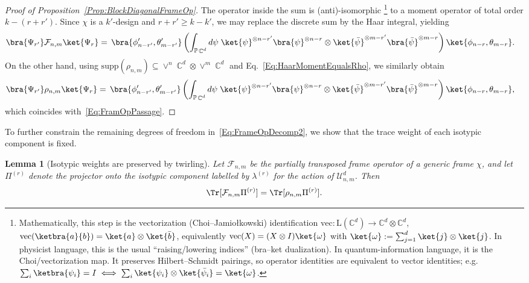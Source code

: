 \documentclass[aps,twocolumn,pra,superscriptaddress,nofootinbib]{revtex4-2}
\newtheorem{lem}{Lemma}
\DeclareMathOperator{\C}{\mathbb{C}} %
\begin{document}
\begin{proof}[Proof of Proposition~\ref{Prop:BlockDiagonalFrameOp}]
The operator inside the sum is (anti)-isomorphic \footnote{Mathematically, this step is the vectorization (Choi--Jamiołkowski) identification
$\mathrm{vec}:\mathrm{L}(\mathbb C^d)\to \mathbb C^d\otimes\mathbb C^d$,
$\mathrm{vec}(\ketbra{a}{b})=\ket{a}\otimes\ket{\bar b}$, equivalently
$\mathrm{vec}(X)=(X\otimes I)\ket{\omega}$ with
$\ket{\omega}:=\sum_{j=1}^d\ket{j}\otimes\ket{j}$.
In physicist language, this is the usual “raising/lowering indices” (bra--ket dualization). In quantum-information language, it is the Choi/vectorization map. It preserves Hilbert--Schmidt pairings, so operator identities are equivalent to vector identities; e.g.
$\sum_i\ketbra{\psi_i}=I \iff \sum_i \ket{\psi_i}\otimes\ket{\bar\psi_i}=\ket{\omega}$.} to a moment
operator of total order $k-(r+r')$. Since $\chi$ is a $k'$-design and $r+r'\ge k-k'$, we may replace the discrete sum
by the Haar integral, yielding
\begin{align}
\bra{\Psi_{r'}}\mathcal{F}_{n,m}\ket{\Psi_{r}}
&=
\,
{\bra{\phi'_{n-r'},\theta'_{m-r'}}}
\left(
\int_{\mathbb{P}\C^d} d\psi\;
\ket{\psi}^{\otimes n-r'}\bra{\psi}^{\otimes n-r}
\otimes
\ket{\bar{\psi}}^{\otimes m-r'}\bra{\bar{\psi}}^{\otimes m-r}
\right)
\ket{\phi_{n-r},\theta_{m-r}}.
\label{Eq:FramOpPassage}
\end{align}
On the other hand, using $\mathrm{supp}(\rho_{n,m})\subseteq \vee^{n}\C^d\otimes \vee^{m}\C^d$ and
Eq.~\eqref{Eq:HaarMomentEqualsRho}, we similarly obtain
\begin{align}
\bra{\Psi_{r'}}\rho_{n,m}\ket{\Psi_{r}}
&=
\,
{\bra{\phi'_{n-r'},\theta'_{m-r'}}}
\left(
\int_{\mathbb{P}\C^d} d\psi\;
\ket{\psi}^{\otimes n-r'}\bra{\psi}^{\otimes n-r}
\otimes
\ket{\bar{\psi}}^{\otimes m-r'}\bra{\bar{\psi}}^{\otimes m-r}
\right)
\ket{\phi_{n-r},\theta_{m-r}},
\end{align}
which coincides with~\eqref{Eq:FramOpPassage}.
\end{proof}

To further constrain the remaining degrees of freedom in~\eqref{Eq:FrameOpDecomp2}, we show that the trace weight of each isotypic component is fixed.

\begin{lem}[Isotypic weights are preserved by twirling]\label{lem:IsotipicWeigth}
Let $\mathcal F_{n,m}$ be the partially transposed frame operator of a generic frame $\chi$, and let $\Pi^{(r)}$ denote the
projector onto the isotypic component labelled by $\lambda^{(r)}$ for the action of $\mathcal U_{n,m}^d$. Then
\begin{equation}\label{Eq:IsotypicWeight}
\Tr[\mathcal{F}_{n,m}\Pi^{(r)}]=\Tr[\rho_{n,m}\Pi^{(r)}].
\end{equation}
\end{lem}
\end{document}
